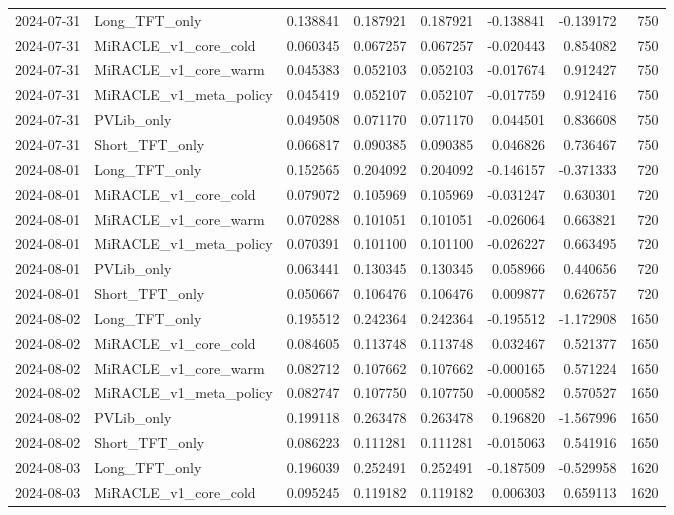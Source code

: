 \begin{tabular}{llrrrrrr}
2024-07-31 & Long_TFT_only & 0.138841 & 0.187921 & 0.187921 & -0.138841 & -0.139172 & 750 \\
2024-07-31 & MiRACLE_v1_core_cold & 0.060345 & 0.067257 & 0.067257 & -0.020443 & 0.854082 & 750 \\
2024-07-31 & MiRACLE_v1_core_warm & 0.045383 & 0.052103 & 0.052103 & -0.017674 & 0.912427 & 750 \\
2024-07-31 & MiRACLE_v1_meta_policy & 0.045419 & 0.052107 & 0.052107 & -0.017759 & 0.912416 & 750 \\
2024-07-31 & PVLib_only & 0.049508 & 0.071170 & 0.071170 & 0.044501 & 0.836608 & 750 \\
2024-07-31 & Short_TFT_only & 0.066817 & 0.090385 & 0.090385 & 0.046826 & 0.736467 & 750 \\
2024-08-01 & Long_TFT_only & 0.152565 & 0.204092 & 0.204092 & -0.146157 & -0.371333 & 720 \\
2024-08-01 & MiRACLE_v1_core_cold & 0.079072 & 0.105969 & 0.105969 & -0.031247 & 0.630301 & 720 \\
2024-08-01 & MiRACLE_v1_core_warm & 0.070288 & 0.101051 & 0.101051 & -0.026064 & 0.663821 & 720 \\
2024-08-01 & MiRACLE_v1_meta_policy & 0.070391 & 0.101100 & 0.101100 & -0.026227 & 0.663495 & 720 \\
2024-08-01 & PVLib_only & 0.063441 & 0.130345 & 0.130345 & 0.058966 & 0.440656 & 720 \\
2024-08-01 & Short_TFT_only & 0.050667 & 0.106476 & 0.106476 & 0.009877 & 0.626757 & 720 \\
2024-08-02 & Long_TFT_only & 0.195512 & 0.242364 & 0.242364 & -0.195512 & -1.172908 & 1650 \\
2024-08-02 & MiRACLE_v1_core_cold & 0.084605 & 0.113748 & 0.113748 & 0.032467 & 0.521377 & 1650 \\
2024-08-02 & MiRACLE_v1_core_warm & 0.082712 & 0.107662 & 0.107662 & -0.000165 & 0.571224 & 1650 \\
2024-08-02 & MiRACLE_v1_meta_policy & 0.082747 & 0.107750 & 0.107750 & -0.000582 & 0.570527 & 1650 \\
2024-08-02 & PVLib_only & 0.199118 & 0.263478 & 0.263478 & 0.196820 & -1.567996 & 1650 \\
2024-08-02 & Short_TFT_only & 0.086223 & 0.111281 & 0.111281 & -0.015063 & 0.541916 & 1650 \\
2024-08-03 & Long_TFT_only & 0.196039 & 0.252491 & 0.252491 & -0.187509 & -0.529958 & 1620 \\
2024-08-03 & MiRACLE_v1_core_cold & 0.095245 & 0.119182 & 0.119182 & 0.006303 & 0.659113 & 1620 \\

\end{tabular}
